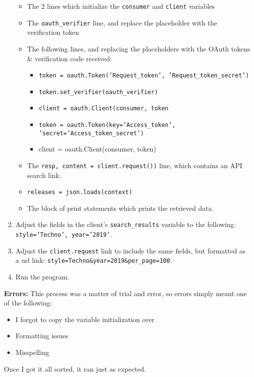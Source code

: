 \documentclass{article}
\begin{document}
\begin{enumerate}
\begin{itemize}
        \item The 2 lines which initialize the \texttt{consumer} and \texttt{client} variables
        \item The \verb|oauth_verifier| line, and replace the placeholder with the verification token
        \item The following lines, and replacing the placeholders with the OAuth tokens \& verification code received:
        \begin{itemize}
            \item \texttt{token = oauth.Token('Request\_token', 'Request\_token\_secret')}
            \item \texttt{token.set\_verifier(oauth\_verifier)}
            \item \texttt{client = oauth.Client(consumer, token}
            \item \texttt{token = oauth.Token(key='Access\_token', \\'secret='Access\_token\_secret')}
            \item {client = oauth.Client(consumer, token)}
        \end{itemize}
        \item The \texttt{resp, content = client.request())} line, which contains an API search link.
        \item \texttt{releases = json.loads(context)}
        \item The block of print statements which prints the retrieved data.
    \end{itemize}
    \item Adjust the fields in the client's \texttt{search\_results} variable to the following: \texttt{style='Techno', year='2019'}.
    \item Adjust the \texttt{client.request} link to include the same fields, but formatted as a url link: \texttt{style=Techno\&year=2019\&per\_page=100}.
    \item Run the program.
\end{enumerate}
\textbf{Errors:} This process was a matter of trial and error, so errors simply meant one of the following:
\begin{itemize}
    \item I forgot to copy the variable initialization over
    \item Formatting issues
    \item Misspelling
\end{itemize}
Once I got it all sorted, it ran just as expected.\\
\end{document}

